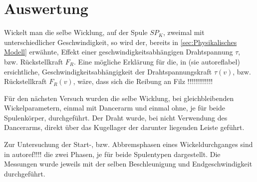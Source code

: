 \section{Auswertung}
\label{sec:Auswertung}

Wickelt man die selbe Wicklung, auf der Spule $SP_K$, zweimal mit unterschiedlicher Geschwindigkeit, so wird der, bereits in \autoref{sec:Physikalisches Modell} erwähnte, Effekt einer geschwindigkeitsabhängigen Drahtspannung $\tau$, bzw. Rückstellkraft $F_R$.
Eine mögliche Erklärung für die, in (sie autoref{label}) ersichtliche, Geschwindigkeitsabhängigkeit der Drahtspannungskraft $\tau(v)$, bzw. Rückstellkraft $F_R(v)$, wäre, dass sich die Reibung an Filz !!!!!!!!!!!!! \newline


Für den nächsten Versuch wurden die selbe Wicklung, bei gleichbleibenden Wickelparametern, einmal mit Dancerarm und einmal ohne, je für beide Spulenkörper, durchgeführt. Der Draht wurde, bei nicht Verwendung des Dancerarms, direkt über das Kugellager der darunter liegenden Leiste geführt.







Zur Untersuchung der Start-, bzw. Abbremsphasen eines Wickeldurchganges sind in autoref{}!!!! die zwei Phasen, je für beide Spulentypen dargestellt. Die Messungen wurde jeweils mit der selben Beschleunigung und Endgeschwindigkeit durchgeführt.









